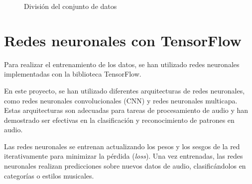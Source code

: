\begin{figure}
  \centering
  \caption{División del conjunto de datos}
\end{figure}

\section{Redes neuronales con TensorFlow}

Para realizar el entrenamiento de los datos, se han utilizado redes neuronales implementadas con la biblioteca TensorFlow.

En este proyecto, se han utilizado diferentes arquitecturas de redes neuronales, como redes neuronales convolucionales (CNN) y redes neuronales multicapa. Estas arquitecturas son adecuadas para tareas de procesamiento de audio y han demostrado ser efectivas en la clasificación y reconocimiento de patrones en audio.

Las redes neuronales se entrenan actualizando los pesos y los sesgos de la red iterativamente para minimizar la pérdida (\textit{loss}). Una vez entrenadas, las redes neuronales realizan predicciones sobre nuevos datos de audio, clasificándolos en categorías o estilos musicales.

